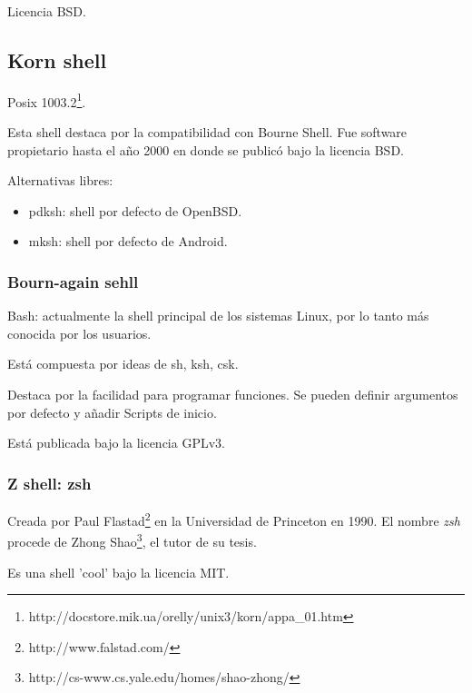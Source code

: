 \documentclass{scrartcl}
\begin{document}
\par Licencia BSD.

\subsection{Korn shell}

\par Posix 1003.2\footnote{http://docstore.mik.ua/orelly/unix3/korn/appa\_01.htm}.

\par Esta shell destaca por la compatibilidad con Bourne Shell. Fue software propietario hasta el a\~no 2000 en donde se public\'o bajo la licencia BSD.

\par Alternativas libres:
\begin{itemize}
	\item pdksh: shell por defecto de OpenBSD.
    \item mksh: shell por defecto de Android.
\end{itemize}

\subsubsection{Bourn-again sehll}

\par Bash: actualmente la shell principal de los sistemas Linux, por lo tanto m\'as conocida por los usuarios.

\par Est\'a compuesta por ideas de sh, ksh, csk.

\par Destaca por la facilidad para programar funciones. Se pueden definir argumentos por defecto y a\~nadir Scripts de inicio.

\par Est\'a publicada bajo la licencia GPLv3.

\subsubsection{Z shell: zsh}

\par Creada por Paul Flastad\footnote{http://www.falstad.com/} en la Universidad de Princeton en 1990. El nombre \emph{zsh} procede de Zhong Shao\footnote{http://cs-www.cs.yale.edu/homes/shao-zhong/}, el tutor de su tesis.

\par Es una shell 'cool' bajo la licencia MIT.
\end{document}
